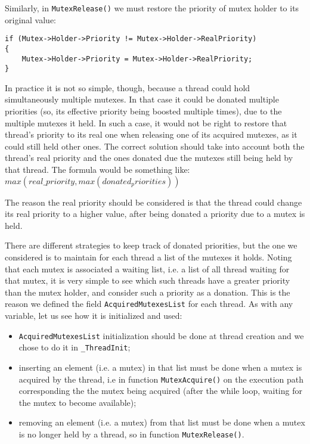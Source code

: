 Similarly, in \lstinline|MutexRelease()| we must restore the priority of mutex holder to its original value:
\begin{lstlisting}
if (Mutex->Holder->Priority != Mutex->Holder->RealPriority)
{
    Mutex->Holder->Priority = Mutex->Holder->RealPriority;
}
\end{lstlisting}

In practice it is not so simple, though, because a thread could hold simultaneously multiple mutexes. In that case it could be donated multiple priorities (so, its effective priority being boosted multiple times), due to the multiple mutexes it held. In such a case, it would not be right to restore that thread's priority to its real one when releasing one of its acquired mutexes, as it could still held other ones. The correct solution should take into account both the thread's real priority and the ones donated due the mutexes still being held by that thread. The formula would be something like:
$max(real\_priority, max(donated_priorities))$

The reason the real priority should be considered is that the thread could change its real priority to a higher value, after being donated a priority due to a mutex is held. 

There are different strategies to keep track of donated priorities, but the one we considered is to maintain for each thread a list of the mutexes it holds. Noting that each mutex is associated a waiting list, i.e. a list of all thread waiting for that mutex, it is very simple to see which such threads have a greater priority than the mutex holder, and consider such a priority as a donation. This is the reason we defined the field \lstinline|AcquiredMutexesList| for each thread. As with any variable, let us see how it is initialized and used:
\begin{itemize}
    \item \lstinline|AcquiredMutexesList| initialization should be done at thread creation and we chose to do it in \lstinline|_ThreadInit|;
    
    \item inserting an element (i.e. a mutex) in that list must be done when a mutex is acquired by the thread, i.e in function \lstinline|MutexAcquire()| on the execution path corresponding the the mutex being acquired (after the while loop, waiting for the mutex to become available);
    
    \item removing an element (i.e. a mutex) from that list must be done when a mutex is no longer held by a thread, so in function \lstinline|MutexRelease()|.
\end{itemize}

